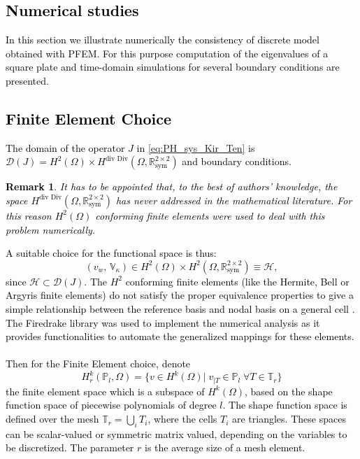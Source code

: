 \documentclass[11pt]{article}
\newtheorem{remark}{Remark}
\newcommand{\revTwo}[1]{\textcolor{black}{#1}}
\begin{document}
	\revTwo{
		\section{Numerical studies}
		\label{sec:Num}
		In this section we illustrate numerically the consistency of discrete model obtained with PFEM. For this purpose computation of the eigenvalues of a square plate and time-domain simulations for several boundary conditions are presented. 
		\subsection{Finite Element Choice}
		The domain of the operator $J$ in \eqref{eq:PH_sys_Kir_Ten} is $\mathcal{D}(J) = H^{2}(\Omega) \times  H^{\text{div Div}}(\Omega, \mathbb{R}^{2 \times 2}_{\text{sym}})$ and boundary conditions. 
		\begin{remark}
			It has to be appointed that, to the best of authors' knowledge, the space $H^{\text{div Div}}(\Omega, \mathbb{R}^{2 \times 2}_{\text{sym}})$ has never addressed in the mathematical literature. For this reason $H^{2}(\Omega)$ conforming finite elements were used to deal with this problem numerically. 
		\end{remark}
		A suitable choice for the functional space is thus:
		\begin{equation}
		(v_w, \,\mathbb{V}_\kappa) \in H^{2}(\Omega) \times H^{2}(\Omega, \mathbb{R}^{2 \times 2}_{\text{sym}}) \equiv \mathscr{H},
		\end{equation}
		since $\mathscr{H} \subset \mathcal{D}(J)$. 
		The $H^2$ conforming finite elements (like the Hermite, Bell or Argyris finite elements) do not satisfy the proper equivalence properties to give a simple relationship between the reference basis and nodal basis on a general cell \cite{KirbyFE}. The Firedrake library \cite{firedrake} was used to implement the numerical analysis as it provides functionalities to automate the generalized mappings for these elements. \\ \\
		Then for the Finite Element choice, denote
		\[ H_r^k(\mathbb{P}_l, \Omega) = \{ v \in H^k(\Omega)|\; v_{|T} \in \mathbb{P}_l \; \forall T \in \mathbb{T}_r \} 
		\]
		the finite element space which is a subspace of $H^k(\Omega)$, based on the shape function space of piecewise polynomials of degree $l$. The shape function space is defined over the mesh $\mathbb{T}_r = \bigcup_i T_i$, where the cells $T_i$ are triangles. These spaces can be scalar-valued or symmetric matrix valued, depending on the variables to be discretized. The parameter $r$ is the average size of a mesh element.
}
\end{document}
